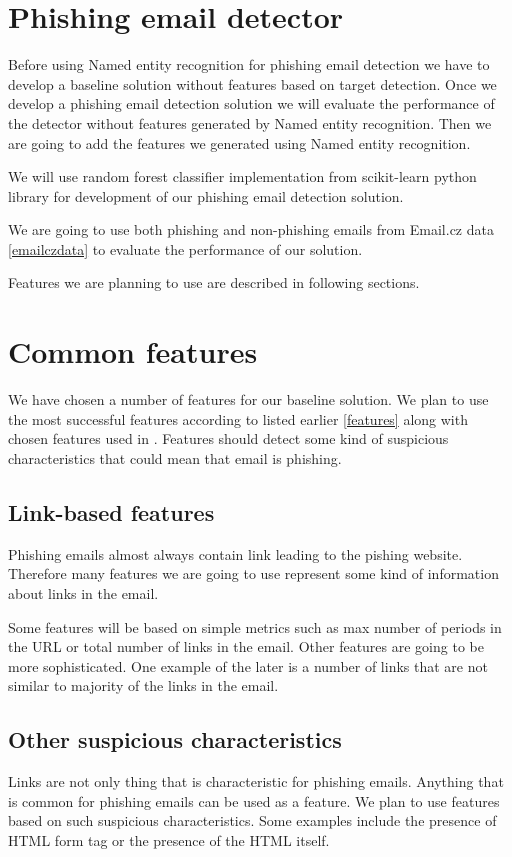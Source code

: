 \documentclass[thesis=B,english]{FITthesis}[2012/10/20]
\begin{document}
\section{Phishing email detector}
Before using Named entity recognition for phishing email detection we have to develop a baseline solution without features based on target detection. Once we develop a phishing email detection solution we will evaluate the performance of the detector without features generated by Named entity recognition. Then we are going to add the features we generated using Named entity recognition. 
\par We will use random forest classifier implementation from scikit-learn \cite{scikit-learn} \cite{pySklearn} python library for development of our phishing email detection solution.
\par We are going to use both phishing and non-phishing emails from Email.cz data \ref{emailczdata} to evaluate the performance of our solution.
\par Features we are planning to use are described in following sections.

\section{Common features}
We have chosen a number of features for our baseline solution. We plan to use the most successful features according to \cite{ultimateFeatureBreakdown} listed earlier \ref{features} along with chosen features used in \cite{vitListik2015detekce}. Features should detect some kind of suspicious characteristics that could mean that email is phishing.
\subsection{Link-based features}
Phishing emails almost always contain link leading to the pishing website. Therefore many features we are going to use represent some kind of information about links in the email.
\par Some features will be based on simple metrics such as max number of periods in the URL or total number of links in the email. Other features are going to be more sophisticated. One example of the later is a number of links that are not similar to majority of the links in the email. 
\subsection{Other suspicious characteristics}
Links are not only thing that is characteristic for phishing emails. Anything that is common for phishing emails can be used as a feature. We plan to use features based on such suspicious characteristics. Some examples include the presence of HTML form tag or the presence of the HTML itself.
\end{document}
